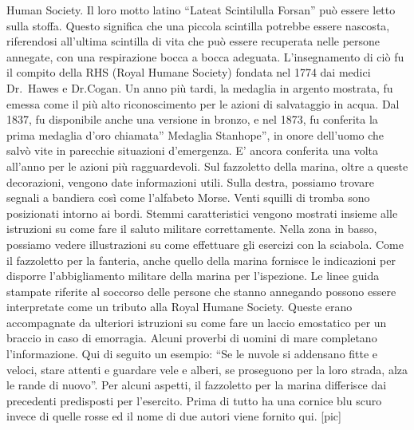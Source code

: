 Human Society. Il loro motto latino ``Lateat Scintilulla Forsan'' può
essere letto sulla stoffa. Questo significa che una piccola scintilla
potrebbe essere nascosta, riferendosi all'ultima scintilla di vita che
può essere recuperata nelle persone annegate, con una respirazione bocca
a bocca adeguata. L'insegnamento di ciò fu il compito della RHS (Royal
Humane Society) fondata nel 1774 dai medici Dr.~Hawes e Dr.Cogan. Un
anno più tardi, la medaglia in argento mostrata, fu emessa come il più
alto riconoscimento per le azioni di salvataggio in acqua. Dal 1837, fu
disponibile anche una versione in bronzo, e nel 1873, fu conferita la
prima medaglia d'oro chiamata'' Medaglia Stanhope'', in onore dell'uomo
che salvò vite in parecchie situazioni d'emergenza. E' ancora conferita
una volta all'anno per le azioni più ragguardevoli. Sul fazzoletto della
marina, oltre a queste decorazioni, vengono date informazioni utili.
Sulla destra, possiamo trovare segnali a bandiera così come l'alfabeto
Morse. Venti squilli di tromba sono posizionati intorno ai bordi. Stemmi
caratteristici vengono mostrati insieme alle istruzioni su come fare il
saluto militare correttamente. Nella zona in basso, possiamo vedere
illustrazioni su come effettuare gli esercizi con la sciabola. Come il
fazzoletto per la fanteria, anche quello della marina fornisce le
indicazioni per disporre l'abbigliamento militare della marina per
l'ispezione. Le linee guida stampate riferite al soccorso delle persone
che stanno annegando possono essere interpretate come un tributo alla
Royal Humane Society. Queste erano accompagnate da ulteriori istruzioni
su come fare un laccio emostatico per un braccio in caso di emorragia.
Alcuni proverbi di uomini di mare completano l'informazione. Qui di
seguito un esempio: ``Se le nuvole si addensano fitte e veloci, stare
attenti e guardare vele e alberi, se proseguono per la loro strada, alza
le rande di nuovo''. Per alcuni aspetti, il fazzoletto per la marina
differisce dai precedenti predisposti per l'esercito. Prima di tutto ha
una cornice blu scuro invece di quelle rosse ed il nome di due autori
viene fornito qui. {[}pic{]}

